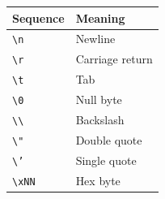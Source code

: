 \begin{center}
\begin{tabular}{ll}
\textbf{Sequence} & \textbf{Meaning} \\
\hline
\texttt{\textbackslash n} & Newline \\
\texttt{\textbackslash r} & Carriage return \\
\texttt{\textbackslash t} & Tab \\
\texttt{\textbackslash 0} & Null byte \\
\texttt{\textbackslash\textbackslash} & Backslash \\
\texttt{\textbackslash "} & Double quote \\
\texttt{\textbackslash '} & Single quote \\
\texttt{\textbackslash xNN} & Hex byte \\
\end{tabular}
\end{center}
